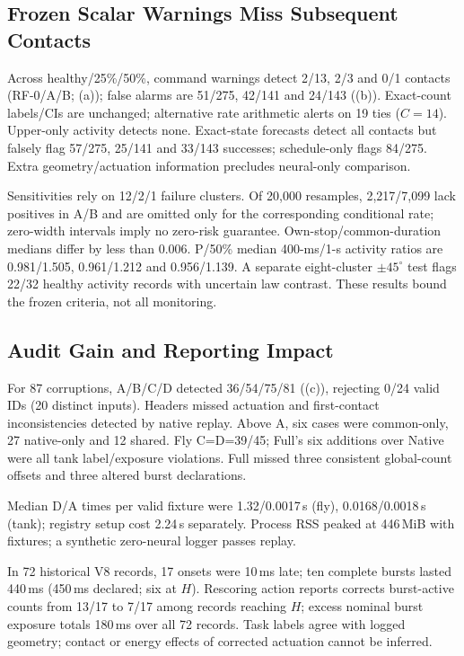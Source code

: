 \subsection{Frozen Scalar Warnings Miss Subsequent Contacts}
\WarningFigure
Across healthy/25\%/50\%, command warnings detect 2/13, 2/3 and 0/1 contacts (RF-0/A/B; \warningRef(a)); false alarms are 51/275, 42/141 and 24/143 (\warningRef(b)). Exact-count labels/CIs are unchanged; alternative rate arithmetic alerts on 19 ties ($C=14$). Upper-only activity detects none. Exact-state forecasts detect all contacts but falsely flag 57/275, 25/141 and 33/143 successes; schedule-only flags 84/275. Extra geometry/actuation information precludes neural-only comparison.

Sensitivities rely on 12/2/1 failure clusters. Of 20,000 resamples, 2,217/7,099 lack positives in A/B and are omitted only for the corresponding conditional rate; zero-width intervals imply no zero-risk guarantee. Own-stop/common-duration medians differ by less than 0.006. P/50\% median 400-ms/1-s activity ratios are 0.981/1.505, 0.961/1.212 and 0.956/1.139. A separate eight-cluster $\pm45^\circ$ test flags 22/32 healthy activity records with uncertain law contrast. These results bound the frozen criteria, not all monitoring.

\subsection{Audit Gain and Reporting Impact}
For 87 corruptions, A/B/C/D detected 36/54/75/81 (\reuseRef(c)), rejecting 0/24 valid IDs (20 distinct inputs). Headers missed actuation and first-contact inconsistencies detected by native replay. Above A, six cases were common-only, 27 native-only and 12 shared. Fly C=D=39/45; Full's six additions over Native were all tank label/exposure violations. Full missed three consistent global-count offsets and three altered burst declarations.

Median D/A times per valid fixture were 1.32/0.0017\,s (fly), 0.0168/0.0018\,s (tank); registry setup cost 2.24\,s separately. Process RSS peaked at 446\,MiB with fixtures; a synthetic zero-neural logger passes replay.

In 72 historical V8 records, 17 onsets were 10\,ms late; ten complete bursts lasted 440\,ms (450\,ms declared; six at $H$). Rescoring action reports corrects burst-active counts from 13/17 to 7/17 among records reaching $H$; excess nominal burst exposure totals 180\,ms over all 72 records. Task labels agree with logged geometry; contact or energy effects of corrected actuation cannot be inferred.

